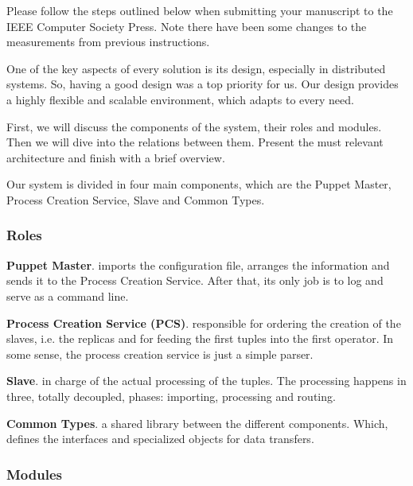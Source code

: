 \documentclass[times, 10pt,twocolumn]{article}
\begin{document}
Please follow the steps outlined below when submitting your 
manuscript to the IEEE Computer Society Press. Note there have 
been some changes to the measurements from previous instructions. 


One of the key aspects of every solution is its design, especially in distributed systems. So, having a good design was a top priority for us. Our design provides a highly flexible and scalable environment, which adapts to every need.

First, we will discuss the components of the system, their roles and modules. Then we will dive into the relations between them. Present the must relevant architecture and finish with a brief overview.


Our system is divided in four main components, which are the Puppet Master, Process Creation Service, Slave and Common Types.

\subsubsection{Roles}

\textbf{Puppet Master}. imports the configuration file, arranges the information and sends it to the Process Creation Service. After that, its only job is to log and serve as a command line.

\textbf{Process Creation Service (PCS)}. responsible for ordering the creation of the slaves, i.e. the replicas and for feeding the first tuples into the first operator. In some sense, the process creation service is just a simple parser.

\textbf{Slave}. in charge of the actual processing of the tuples. The processing happens in three, totally decoupled, phases: importing, processing and routing. 

\textbf{Common Types}. a shared library between the different components. Which, defines the interfaces and specialized objects for data transfers.



\subsubsection{Modules}
\end{document}

